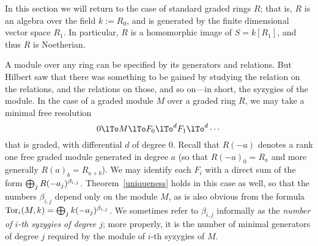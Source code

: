  In this section we will return to the case of standard graded rings $R$; that is, $R$ is an algebra over the field $k := R_0$, and is generated by the finite dimensional vector space $R_1$. In particular, $R$ is a homomorphic image of 
$S = k[R_1]$, and thus $R$ is Noetherian.

A module over any ring can be specified by its generators and relations. But Hilbert saw that there was something to be gained by studying the relation on the relations, and the relations on those, and so on---in short, the syzygies of the module.
In the case of a graded module $M$ over a graded ring $R$, we may take a minimal free resolution
$$
0\lTo M \lTo F_0 \lTo^d F_1\lTo^d\cdots
$$
that is graded, with differential $d$ of degree 0. Recall that $R(-a)$ denotes a rank one free graded module generated in degree $a$ (so that $R(-a)_0 = R_a$ and more generally $R(a)_{b} = R_{a+b}$). We may identify each $F_i$ with a direct sum of the form 
$\bigoplus_j R(-a_j)^{\gb_{i,j}}$. 
Theorem~\ref{uniqueness} holds in this case as well, so that 
the numbers $\beta_{i,j}$ depend only on the module $M$, as is also obvious from the formula $\Tor_i(M,k) = \bigoplus_j k(-a_j)^{\gb_{i,j}}$.
We sometimes refer to $\beta_{i,j}$ informally as the \emph{number of $i$-th syzygies of degree $j$}; more properly, it is the number of minimal generators of degree $j$ required by the module of $i$-th syzygies of $M$.

